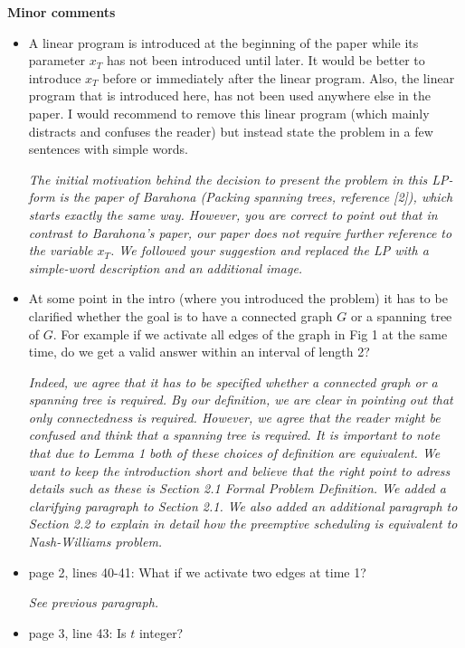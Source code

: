 \documentclass[11pt,a4paper]{article}
\begin{document}
\textbf{Minor comments}

\begin{itemize}

\item A linear program is introduced at the beginning of the paper while its parameter $x_T$ has not been introduced until later. It would be better to introduce $x_T$ before or immediately after the linear program. 
Also, the linear program that is introduced here, has not been used anywhere else in the paper. I would recommend to remove this linear program (which mainly distracts and confuses the reader) but instead state the problem in a few sentences with simple words.

\textit{The initial motivation behind the decision to present the problem in this LP-form is the paper of Barahona (Packing spanning trees, reference [2]), which starts exactly the same way. However, you are correct to point out that in contrast to Barahona's paper, our paper does not require further reference to the variable $x_T$. We followed your suggestion and replaced the LP with a simple-word description and an additional image. }

\item At some point in the intro (where you introduced the problem) it has to be clarified whether the goal is to have a connected graph $G$ or a spanning tree of $G$. For example if we activate all edges of the graph in Fig 1 at the same time, do we get a valid answer within an interval of length 2? 

\textit{ Indeed, we agree that it has to be specified whether a connected graph or a spanning tree is required. By our definition, we are clear in pointing out that only connectedness is required.  However, we agree that the reader might be confused and think that a spanning tree is required. It is important to note that due to Lemma 1 both of these choices of definition are equivalent.  We want to keep the introduction short and believe that the right point to adress details such as these is Section 2.1 Formal Problem Definition. We added a clarifying paragraph to Section 2.1. We also added an additional paragraph to Section 2.2 to explain in detail how the \emph{preemptive} scheduling is equivalent to Nash-Williams problem.}

\item page 2, lines 40-41: What if we activate two edges at time 1?

\textit{See previous paragraph.}

\item page 3, line 43: Is $t$ integer?


\end{itemize}
\end{document}

